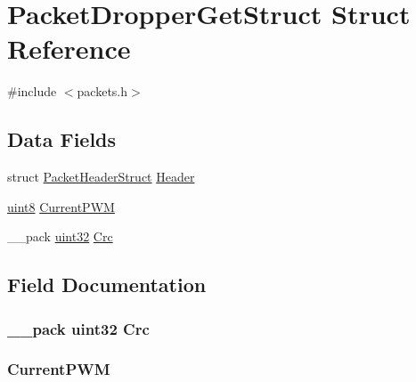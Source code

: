 \hypertarget{struct_packet_dropper_get_struct}{}\section{Packet\+Dropper\+Get\+Struct Struct Reference}
\label{struct_packet_dropper_get_struct}


{\ttfamily \#include $<$packets.\+h$>$}

\subsection*{Data Fields}
\begin{DoxyCompactItemize}
\item 
struct \hyperlink{struct_packet_header_struct}{Packet\+Header\+Struct} \hyperlink{struct_packet_dropper_get_struct_ab201af50281aff5ed4f984f994938007}{Header}
\item 
\hyperlink{_h_y_d_r_a_s_8_x_2types_8h_a33a5e996e7a90acefb8b1c0bea47e365}{uint8} \hyperlink{struct_packet_dropper_get_struct_abecdcdeed8921721bddb9b4b46dd532e}{Current\+P\+W\+M}
\item 
\+\_\+\+\_\+pack \hyperlink{_h_y_d_r_a_s_8_x_2types_8h_acbd4acd0d29e2d6c43104827f77d9cd2}{uint32} \hyperlink{struct_packet_dropper_get_struct_a9ac0191cb1217dfb4164ca0e333de3ac}{Crc}
\end{DoxyCompactItemize}


\subsection{Field Documentation}
\hypertarget{struct_packet_dropper_get_struct_a9ac0191cb1217dfb4164ca0e333de3ac}{}
\subsubsection[{Crc}]{\setlength{\rightskip}{0pt plus 5cm}\+\_\+\+\_\+pack {\bf uint32} Crc}\label{struct_packet_dropper_get_struct_a9ac0191cb1217dfb4164ca0e333de3ac}
\hypertarget{struct_packet_dropper_get_struct_abecdcdeed8921721bddb9b4b46dd532e}{}
\subsubsection[{Current\+P\+W\+M}]{ Current\+P\+W\+M}\label{struct_packet_dropper_get_struct_abecdcdeed8921721bddb9b4b46dd532e}
\hypertarget{struct_packet_dropper_get_struct_ab201af50281aff5ed4f984f994938007}{}
